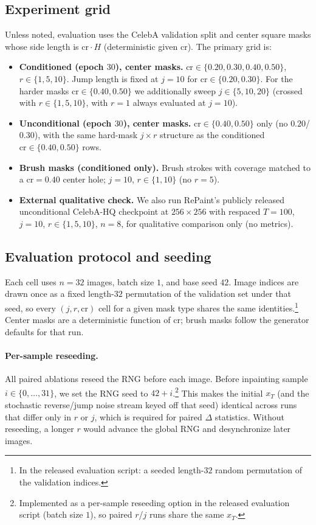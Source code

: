 \subsection{Experiment grid}
\label{sec:grid}
Unless noted, evaluation uses the CelebA validation split and center square masks whose side length is $\mathrm{cr}\cdot H$ (deterministic given $\mathrm{cr}$).
The primary grid is:
\begin{itemize}
  \item \textbf{Conditioned (epoch $30$), center masks.}
  $\mathrm{cr}\in\{0.20,0.30,0.40,0.50\}$, $r\in\{1,5,10\}$.
  Jump length is fixed at $j{=}10$ for $\mathrm{cr}\in\{0.20,0.30\}$.
  For the harder masks $\mathrm{cr}\in\{0.40,0.50\}$ we additionally sweep $j\in\{5,10,20\}$ (crossed with $r\in\{1,5,10\}$, with $r{=}1$ always evaluated at $j{=}10$).
  \item \textbf{Unconditional (epoch $30$), center masks.}
  $\mathrm{cr}\in\{0.40,0.50\}$ only (no $0.20$/$0.30$), with the same hard-mask $j{\times}r$ structure as the conditioned $\mathrm{cr}\in\{0.40,0.50\}$ rows.
  \item \textbf{Brush masks (conditioned only).}
  Brush strokes with coverage matched to a $\mathrm{cr}{=}0.40$ center hole; $j{=}10$, $r\in\{1,10\}$ (no $r{=}5$).
  \item \textbf{External qualitative check.}
  We also run RePaint's publicly released unconditional CelebA-HQ checkpoint at $256{\times}256$ with respaced $T{=}100$, $j{=}10$, $r\in\{1,5,10\}$, $n{=}8$, for qualitative comparison only (no metrics).
\end{itemize}

\subsection{Evaluation protocol and seeding}
\label{sec:eval-protocol}
Each cell uses $n{=}32$ images, batch size $1$, and base seed $42$.
Image indices are drawn once as a fixed length-$32$ permutation of the validation set under that seed, so every $(j,r,\mathrm{cr})$ cell for a given mask type shares the same identities.\footnote{%
In the released evaluation script: a seeded length-$32$ random permutation of the validation indices.}
Center masks are a deterministic function of $\mathrm{cr}$; brush masks follow the generator defaults for that run.

\paragraph{Per-sample reseeding.}
All paired ablations reseed the RNG before each image.
Before inpainting sample $i\in\{0,\ldots,31\}$, we set the RNG seed to $42{+}i$.\footnote{%
Implemented as a per-sample reseeding option in the released evaluation script (batch size $1$), so paired $r$/$j$ runs share the same $x_T$.}
This makes the initial $x_T$ (and the stochastic reverse/jump noise stream keyed off that seed) identical across runs that differ only in $r$ or $j$, which is required for paired $\Delta$ statistics.
Without reseeding, a longer $r$ would advance the global RNG and desynchronize later images.

